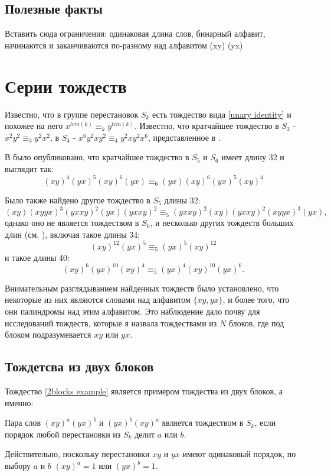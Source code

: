 \newpage
\subsection{Полезные факты}
Вставить сюда ограничения: 
	одинаковая длина слов,
	бинарный алфавит,
	начинаются и заканчиваются по-разному
	над алфавитом (xy) (yx) 

\newpage
\section{Серии тождеств}

Известно, что в группе перестановок $S_k$ есть тождество вида \ref{unary identity}  и похожее на него $x^{lcm(k)} \equiv_k y^{lcm(k)}$. Известно, что кратчайшее тождество в $S_3$ - $x^2y^2 \equiv_3 y^2x^2$, в $S_4$ - $x^6y^2xy^2 \equiv_4 y^2xy^2x^6$, представленное в \cite{remarks on separating}.

В \cite{lower bounds} было опубликовано, что кратчайшее тождество в $S_5$ и $S_6$ имеет длину 32 и выглядит так: 
\begin{equation}
	(xy)^4(yx)^5(xy)^6(yx) \equiv_6 (yx)(xy)^6(yx)^5(xy)^4
\end{equation}

Было также найдено другое тождество в $S_5$ длины 32: 
$$
	(xy)(xyyx)^3(yxxy)^2(yx)(yxxy)^2 \equiv_5 (yxxy)^2(xy)(yxxy)^2(xyyx)^3(yx),
$$
однако оно не является тождеством в $S_6$, и несколько других тождеств больших длин (см. \cite{lower bounds}), включая такое длины 34:
\begin{equation}\label{2blocks example}
	(xy)^{12}(yx)^5 \equiv_5 (yx)^5(xy)^{12}
\end{equation}
и такое длины 40:
\begin{equation} \label{3blocks example}
	(xy)^6(yx)^{10}(xy)^4 \equiv_5 (yx)^4(xy)^{10}(yx)^6.
\end{equation}

Внимательным разглядыванием найденных тождеств было установлено, что некоторые из них являются словами над алфавитом $\{xy, yx\}$, и более того, что они палиндромы над этим алфавитом. Это наблюдение дало почву для исследований тождеств, которые я назвала тождествами из $N$ блоков, где под блоком подразумевается $xy$ или $yx$.


\newpage
\subsection{Тождетсва из двух блоков}


Тождество \ref{2blocks example} является примером тождества из двух блоков, а именно: 
\begin{definition} \label{2blocks definition}
	Пара слов $(xy)^a(yx)^b$ и $(yx)^b(xy)^a$ является тождеством в $S_k$, если порядок любой перестановки из $S_k$ делит $a$ или $b$.
\end{definition}
Действительно, поскольку перестановки $xy$ и $yx$ имеют одинаковый порядок, по выбору $a$ и $b$ $(xy)^a = 1$ или $(yx)^b = 1$.

